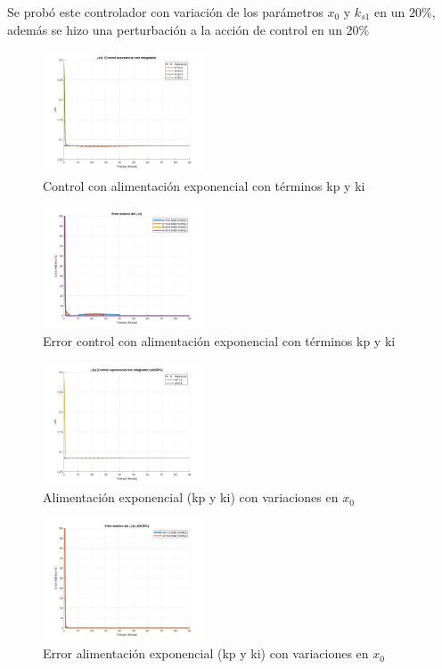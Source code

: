 \documentclass[letterpaper, 10 pt, conference]{ieeeconf}  %
\begin{document}
Se probó este controlador con variación de los parámetros $x_0$ y $k_{s1}$ en un $20\%$, además se hizo una perturbación a la acción de control en un $20\%$

\begin{figure}[H]
  \centering
  \includegraphics[width=0.43\textwidth]{./Images_tp3/exp_ki.png}
  \caption{Control con alimentación exponencial con términos kp y ki}
\end{figure}
\begin{figure}[H]
  \centering
  \includegraphics[width=0.43\textwidth]{./Images_tp3/exp_err_ki.png}
  \caption{Error control con alimentación exponencial con términos kp y ki}
\end{figure}

\begin{figure}[H]
  \centering
  \includegraphics[width=0.43\textwidth]{./Images_tp3/exp_rob_x0.png}
  \caption{Alimentación exponencial (kp y ki) con variaciones en $x_{0}$ }
\end{figure}
\begin{figure}[H]
  \centering
  \includegraphics[width=0.43\textwidth]{./Images_tp3/exp_rob_err_x0.png}
  \caption{Error alimentación exponencial (kp y ki) con variaciones en $x_{0}$ }
\end{figure}
\end{document}
